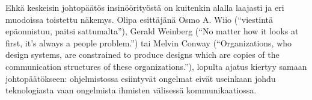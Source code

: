 Ehkä keskeisin johtopäätös insinöörityöstä on kuitenkin alalla laajasti
ja eri muodoissa toistettu näkemys. Olipa esittäjänä Osmo A. Wiio
(``viestintä epäonnistuu, paitsi sattumalta''), Gerald Weinberg (``No
matter how it looks at first, it's always a people problem.'') tai
Melvin Conway (``Organizations, who design systems, are constrained to
produce designs which are copies of the communication structures of
these organizations.''), lopulta ajatus kiertyy samaan johtopäätökseen:
ohjelmistossa esiintyvät ongelmat eivät useinkaan johdu teknologiasta
vaan ongelmista ihmisten välisessä kommunikaatiossa.
